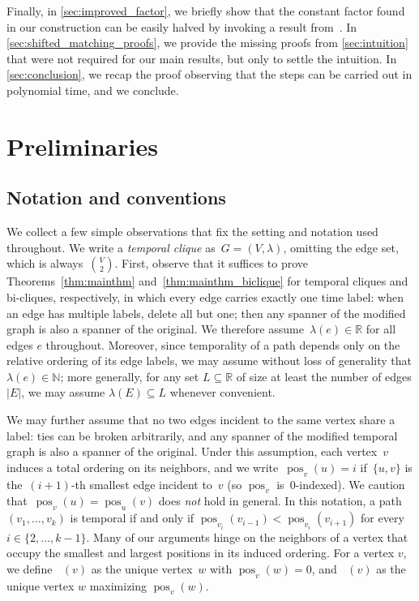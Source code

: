 \documentclass[11pt, letterpaper]{article}
\renewcommand{\subset}{\subseteq}
\DeclareMathOperator{\pos}{pos}
\DeclareMathOperator{\minmat}{N_{\mathrm{min}}}
\DeclareMathOperator{\maxmat}{N_{\mathrm{max}}}
\theoremstyle{definition}
\theoremstyle{plain}
\begin{document}
Finally, in \cref{sec:improved_factor}, we briefly show that the constant factor found in our construction can be easily halved by invoking a result from~\cite{Carnevale25}. In \cref{sec:shifted_matching_proofs}, we provide the missing proofs from \cref{sec:intuition} that were not required for our main results, but only to settle the intuition.
In \cref{sec:conclusion}, we recap the proof observing that the steps can be carried out in polynomial time, and we conclude.
 


\section{Preliminaries}
\label{sec:preliminaries}

\subsection{Notation and conventions}
We collect a few simple observations that fix the setting and notation used throughout. 
We write a \emph{temporal clique} as~$G=(V,\lambda)$, omitting the edge set, which is always~$\binom{V}{2}$. 
First, observe that it suffices to prove Theorems~\ref{thm:mainthm} and~\ref{thm:mainthm_biclique} for temporal cliques and bi-cliques, respectively, in which every edge carries exactly one time label: when an edge has multiple labels, delete all but one; then any spanner of the modified graph is also a spanner of the original.
We therefore assume~$\lambda(e)\in\mathbb{R}$ for all edges $e$ throughout.
Moreover, since temporality of a path depends only on the relative ordering of its edge labels, we may assume without loss of generality that
$\lambda(e)\in\mathbb{N}$; more generally, for any set $L\subset\mathbb{R}$ of size at least the number of edges $|E|$, we may assume $\lambda(E)\subset L$ whenever convenient.

We may further assume that no two edges incident to the same vertex share a label: ties can be broken arbitrarily, and any spanner of the modified temporal graph is also a spanner of the original.
Under this assumption, each vertex~$v$ induces a total ordering on its neighbors, and we write~$\pos_v(u)=i$ if~$\{u,v\}$ is the~$(i+1)$-th smallest edge incident to~$v$ (so $\pos_v$ is~$0$-indexed).
We caution that~$\pos_v(u)=\pos_u(v)$ does \emph{not} hold in general.
In this notation, a path $(v_1,\dots,v_k)$ is temporal if and only if $\pos_{v_i}(v_{i-1})<\pos_{v_i}(v_{i+1})$ for every~$i\in\{2,\dots,k-1\}$.
Many of our arguments hinge on the neighbors of a vertex that occupy the smallest and largest positions in its induced ordering. 
For a vertex $v$, we define $\minmat(v)$ as the unique vertex~$w$ with $\pos_v(w)=0$, and $\maxmat(v)$ as the unique vertex $w$ maximizing $\pos_v(w)$.
\end{document}
